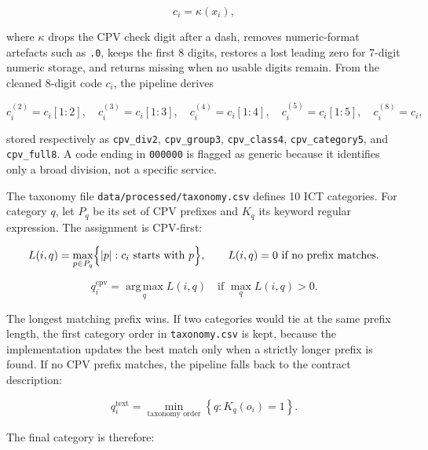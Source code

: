 \documentclass[12pt, a4paper]{article}
\begin{document}
\begin{equation}
  c_i = \kappa(x_i),
\end{equation}

\noindent where $\kappa$ drops the CPV check digit after a dash, removes
numeric-format artefacts such as \texttt{.0}, keeps the first 8 digits, restores
a lost leading zero for 7-digit numeric storage, and returns missing when no
usable digits remain. From the cleaned 8-digit code $c_i$, the pipeline derives

\begin{equation}
  c_i^{(2)}=c_i[1\!:\!2],\quad
  c_i^{(3)}=c_i[1\!:\!3],\quad
  c_i^{(4)}=c_i[1\!:\!4],\quad
  c_i^{(5)}=c_i[1\!:\!5],\quad
  c_i^{(8)}=c_i,
\end{equation}

\noindent stored respectively as \texttt{cpv\_div2}, \texttt{cpv\_group3},
\texttt{cpv\_class4}, \texttt{cpv\_category5}, and \texttt{cpv\_full8}. A code
ending in \texttt{000000} is flagged as generic because it identifies only a
broad division, not a specific service.

The taxonomy file \nolinkurl{data/processed/taxonomy.csv} defines 10 ICT
categories. For category $q$, let $P_q$ be its set of CPV prefixes and $K_q$
its keyword regular expression. The assignment is CPV-first:

\begin{equation}
  L(i,q) =
  \max_{p\in P_q}
  \Bigl\{|p| : c_i \text{ starts with } p\Bigr\},
  \qquad
  L(i,q)=0 \text{ if no prefix matches.}
\end{equation}

\begin{equation}
  q_i^{\text{cpv}} =
  \operatorname*{arg\,max}_{q} L(i,q)
  \quad \text{if } \max_q L(i,q)>0.
\end{equation}

\noindent The longest matching prefix wins. If two categories would tie at the
same prefix length, the first category order in \texttt{taxonomy.csv} is kept,
because the implementation updates the best match only when a strictly longer
prefix is found. If no CPV prefix matches, the pipeline falls back to the
contract description:

\begin{equation}
  q_i^{\text{text}} =
  \min_{\text{taxonomy order}}
  \left\{q : K_q(o_i)=1\right\}.
\end{equation}

The final category is therefore:
\end{document}
